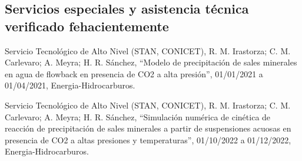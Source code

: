 \documentclass[margin,line]{res}
\begin{document}
\begin{resume}

%
%
%

\subsection{ Servicios especiales y asistencia técnica verificado fehacientemente}

Servicio Tecnológico de Alto Nivel (STAN, CONICET), R. M. Irastorza; C. M. Carlevaro; A. Meyra; H. R. Sánchez, ``Modelo de precipitación de sales minerales en agua de flowback en presencia de CO2 a alta presión'', 01/01/2021 a 01/04/2021, Energia-Hidrocarburos.

Servicio Tecnológico de Alto Nivel (STAN, CONICET), R. M. Irastorza; C. M. Carlevaro; A. Meyra; H. R. Sánchez, ``Simulación numérica de cinética de reacción de precipitación de sales minerales a partir de suspensiones acuosas en presencia de CO2 a altas presiones y temperaturas'', 01/10/2022 a 01/12/2022, Energia-Hidrocarburos.



\end{resume}
\end{document}
